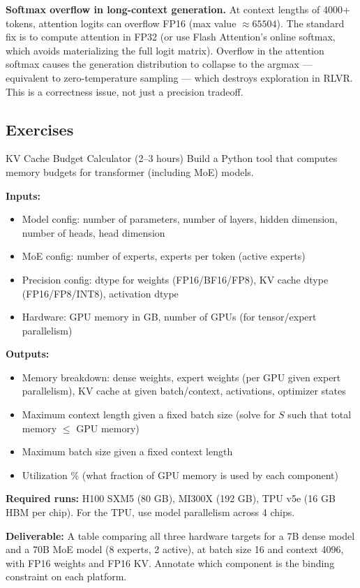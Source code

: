 \textbf{Softmax overflow in long-context generation.} At context lengths of 4000+ tokens, attention logits can overflow FP16 (max value $\approx 65504$). The standard fix is to compute attention in FP32 (or use Flash Attention's online softmax, which avoids materializing the full logit matrix). Overflow in the attention softmax causes the generation distribution to collapse to the argmax --- equivalent to zero-temperature sampling --- which destroys exploration in RLVR. This is a correctness issue, not just a precision tradeoff.

\subsection{Exercises}

\begin{exercise}{KV Cache Budget Calculator (2--3 hours)}
Build a Python tool that computes memory budgets for transformer (including MoE) models.

\textbf{Inputs:}
\begin{itemize}
  \item Model config: number of parameters, number of layers, hidden dimension, number of heads, head dimension
  \item MoE config: number of experts, experts per token (active experts)
  \item Precision config: dtype for weights (FP16/BF16/FP8), KV cache dtype (FP16/FP8/INT8), activation dtype
  \item Hardware: GPU memory in GB, number of GPUs (for tensor/expert parallelism)
\end{itemize}

\textbf{Outputs:}
\begin{itemize}
  \item Memory breakdown: dense weights, expert weights (per GPU given expert parallelism), KV cache at given batch/context, activations, optimizer states
  \item Maximum context length given a fixed batch size (solve for $S$ such that total memory $\leq$ GPU memory)
  \item Maximum batch size given a fixed context length
  \item Utilization \% (what fraction of GPU memory is used by each component)
\end{itemize}

\textbf{Required runs:} H100 SXM5 (80 GB), MI300X (192 GB), TPU v5e (16 GB HBM per chip). For the TPU, use model parallelism across 4 chips.

\textbf{Deliverable:} A table comparing all three hardware targets for a 7B dense model and a 70B MoE model (8 experts, 2 active), at batch size 16 and context 4096, with FP16 weights and FP16 KV. Annotate which component is the binding constraint on each platform.
\end{exercise}


